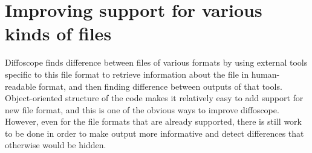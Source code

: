 \section{Improving support for various kinds of files}


Diffoscope finds difference between files of various formats by using external
tools specific to this file format to retrieve information about the file in
human-readable format, and then finding difference between outputs of that tools.
Object-oriented structure of the code makes it relatively easy to add support for
new file format, and this is one of the obvious ways to improve diffoscope.\\
However, even for the file formats that are already supported, there is still work
to be done in order to make output more informative and detect differences that
otherwise would be hidden.\\

